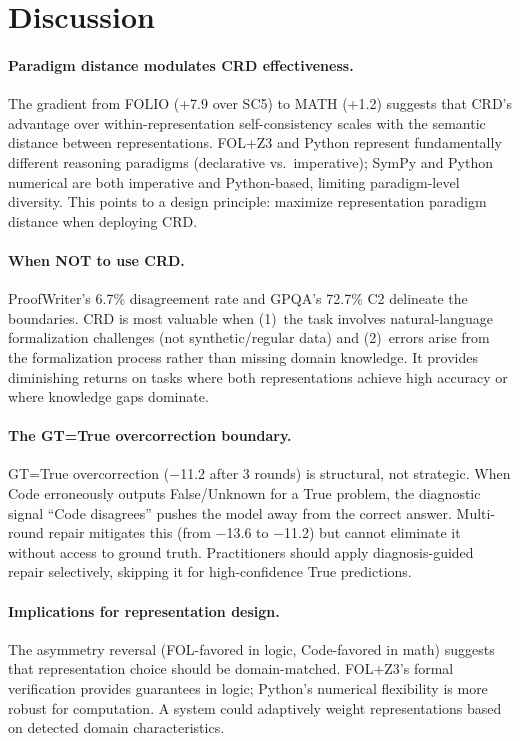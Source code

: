 \documentclass[11pt,a4paper]{article}
\newcommand{\pp}{\text{pp}}
\begin{document}
\section{Discussion}

\paragraph{Paradigm distance modulates CRD effectiveness.}
The gradient from FOLIO (+7.9\pp{} over SC5) to MATH (+1.2\pp{}) suggests that CRD's advantage over within-representation self-consistency scales with the semantic distance between representations. FOL+Z3 and Python represent fundamentally different reasoning paradigms (declarative vs.\ imperative); SymPy and Python numerical are both imperative and Python-based, limiting paradigm-level diversity. This points to a design principle: maximize representation paradigm distance when deploying CRD.

\paragraph{When NOT to use CRD.}
ProofWriter's 6.7\% disagreement rate and GPQA's 72.7\% C2 delineate the boundaries. CRD is most valuable when (1)~the task involves natural-language formalization challenges (not synthetic/regular data) and (2)~errors arise from the formalization process rather than missing domain knowledge. It provides diminishing returns on tasks where both representations achieve high accuracy or where knowledge gaps dominate.

\paragraph{The GT=True overcorrection boundary.}
GT=True overcorrection ($-$11.2\pp{} after 3 rounds) is structural, not strategic. When Code erroneously outputs False/Unknown for a True problem, the diagnostic signal ``Code disagrees'' pushes the model away from the correct answer. Multi-round repair mitigates this (from $-$13.6 to $-$11.2\pp{}) but cannot eliminate it without access to ground truth. Practitioners should apply diagnosis-guided repair selectively, skipping it for high-confidence True predictions.

\paragraph{Implications for representation design.}
The asymmetry reversal (FOL-favored in logic, Code-favored in math) suggests that representation choice should be domain-matched. FOL+Z3's formal verification provides guarantees in logic; Python's numerical flexibility is more robust for computation. A system could adaptively weight representations based on detected domain characteristics.
\end{document}
